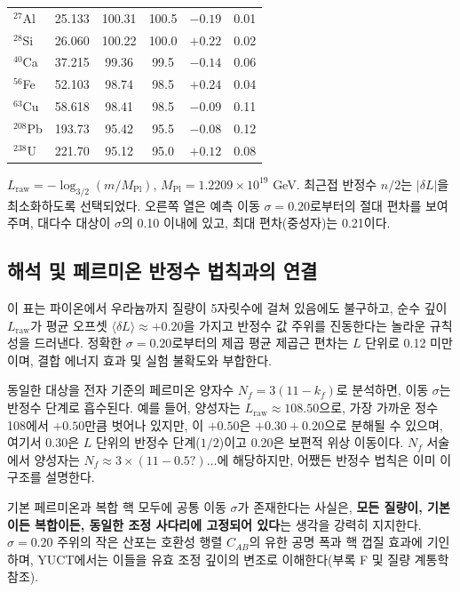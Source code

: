\documentclass[12pt,a4paper]{article}
\begin{document}
\begin{table}[htbp]
\begin{tabular}{l c c c c c}
			\(^{27}\)Al & 25.133 & 100.31 & 100.5 & \(-0.19\) & 0.01 \\
			\(^{28}\)Si & 26.060 & 100.22 & 100.0 & \(+0.22\) & 0.02 \\
			\(^{40}\)Ca & 37.215 & 99.36  & 99.5  & \(-0.14\) & 0.06 \\
			\(^{56}\)Fe & 52.103 & 98.74  & 98.5  & \(+0.24\) & 0.04 \\
			\(^{63}\)Cu & 58.618 & 98.41  & 98.5  & \(-0.09\) & 0.11 \\
			\(^{208}\)Pb & 193.73 & 95.42  & 95.5  & \(-0.08\) & 0.12 \\
			\(^{238}\)U & 221.70 & 95.12  & 95.0  & \(+0.12\) & 0.08 \\
			\bottomrule
		\end{tabular}
		\par\smallskip
		\footnotesize
		\(L_{\mathrm{raw}} = -\log_{3/2}(m/M_{\mathrm{Pl}})\), \(M_{\mathrm{Pl}} = 1.2209\times10^{19}\) GeV. 최근접 반정수 \(n/2\)는 \(|\delta L|\)을 최소화하도록 선택되었다. 오른쪽 열은 예측 이동 \(\sigma = 0.20\)로부터의 절대 편차를 보여주며, 대다수 대상이 \(\sigma\)의 0.10 이내에 있고, 최대 편차(중성자)는 0.21이다.
	\end{table}
	
	\subsection{해석 및 페르미온 반정수 법칙과의 연결}
	
	이 표는 파이온에서 우라늄까지 질량이 5자릿수에 걸쳐 있음에도 불구하고, 순수 깊이 \(L_{\mathrm{raw}}\)가 평균 오프셋 \(\langle \delta L \rangle \approx +0.20\)을 가지고 반정수 값 주위를 진동한다는 놀라운 규칙성을 드러낸다. 정확한 \(\sigma = 0.20\)로부터의 제곱 평균 제곱근 편차는 \(L\) 단위로 0.12 미만이며, 결합 에너지 효과 및 실험 불확도와 부합한다.
	
	동일한 대상을 전자 기준의 페르미온 양자수 \(N_f = 3(11 - k_f)\)로 분석하면, 이동 \(\sigma\)는 반정수 단계로 흡수된다. 예를 들어, 양성자는 \(L_{\mathrm{raw}} \approx 108.50\)으로, 가장 가까운 정수 108에서 \(+0.50\)만큼 벗어나 있지만, 이 \(+0.50\)은 \(+0.30 + 0.20\)으로 분해될 수 있으며, 여기서 0.30은 \(L\) 단위의 반정수 단계(\(1/2\))이고 0.20은 보편적 위상 이동이다. \(N_f\) 서술에서 양성자는 \(N_f \approx 3 \times (11 - 0.5?) \dots\)에 해당하지만, 어쨌든 반정수 법칙은 이미 이 구조를 설명한다.
	
	기본 페르미온과 복합 핵 모두에 공통 이동 \(\sigma\)가 존재한다는 사실은, \textbf{모든 질량이, 기본이든 복합이든, 동일한 조정 사다리에 고정되어 있다}는 생각을 강력히 지지한다. \(\sigma=0.20\) 주위의 작은 산포는 호환성 행렬 \(C_{AB}\)의 유한 공명 폭과 핵 껍질 효과에 기인하며, YUCT에서는 이들을 유효 조정 깊이의 변조로 이해한다(부록 F 및 질량 계통학 참조).
	
\end{document}
